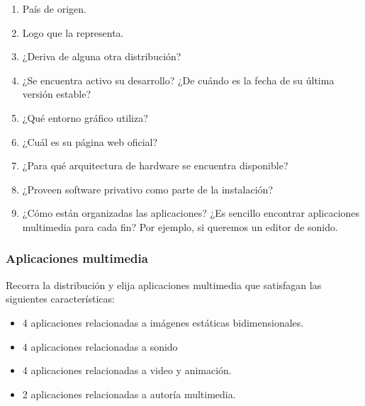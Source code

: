 \documentclass[12pt]{article}
\begin{document}
\begin{enumerate}

    \item País de origen.

    \item Logo que la representa.

    \item ¿Deriva de alguna otra distribución?

    \item ¿Se encuentra activo su desarrollo? ¿De cuándo es la fecha de su
    última versión estable?

    \item ¿Qué entorno gráfico utiliza?

    \item ¿Cuál es su página web oficial?

    \item ¿Para qué arquitectura de hardware se encuentra disponible?

    \item ¿Proveen software privativo como parte de la instalación?

    \item ¿Cómo están organizadas las aplicaciones? ¿Es sencillo encontrar
    aplicaciones multimedia para cada fin? Por ejemplo, si queremos un editor
    de sonido.

\end{enumerate}

\subsubsection*{Aplicaciones multimedia}

Recorra la distribución y elija aplicaciones multimedia que satisfagan las
siguientes características:

\begin{itemize}

    \item 4 aplicaciones relacionadas a imágenes estáticas bidimensionales.

    \item 4 aplicaciones relacionadas a sonido

    \item 4 aplicaciones relacionadas a video y animación.

    \item 2 aplicaciones relacionadas a autoría multimedia.

\end{itemize}
\end{document}
